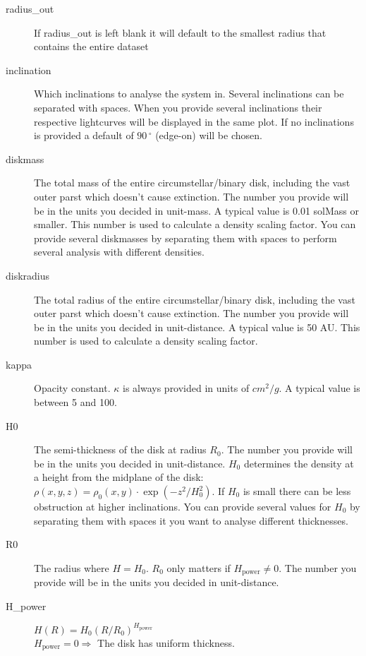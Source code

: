 \documentclass[a4paper, 12pt, english, titlepage]{article}
\newcommand{\degree}{\, ^\circ}    %
\begin{document}
\begin{description}
        \item[radius\_out]
            If radius\_out is left blank it will default to the smallest radius that contains the entire dataset
        \item[inclination]
            Which inclinations to analyse the system in. Several inclinations can be separated with spaces. When you provide several inclinations their respective lightcurves will be displayed in the same plot. If no inclinations is provided a default of $90\degree$ (edge-on) will be chosen.
        \item[diskmass]
            The total mass of the entire circumstellar/binary disk, including the vast outer parst which doesn't cause extinction. The number you provide will be in the units you decided in unit-mass. A typical value is 0.01 solMass or smaller. This number is used to calculate a density scaling factor. You can provide several diskmasses by separating them with spaces to perform several analysis with different densities.
        \item[diskradius]
            The total radius of the entire circumstellar/binary disk, including the vast outer parst which doesn't cause extinction. The number you provide will be in the units you decided in unit-distance. A typical value is 50 AU. This number is used to calculate a density scaling factor.
        \item[kappa]
            Opacity constant. $\kappa$ is always provided in units of $cm^2 / g$. A typical value is between 5 and 100.
        \item[H0]
            The semi-thickness of the disk at radius $R_0$. The number you provide will be in the units you decided in unit-distance. $H_0$ determines the density at a height from the midplane of the disk:
            $\rho(x, y, z) = \rho_0(x, y) \cdot \exp\left(- z^2 / H_0^2\right)$.
            If $H_0$ is small there can be less obstruction at higher inclinations.
            You can provide several values for $H_0$ by separating them with spaces it you want to analyse different thicknesses.
        \item[R0]
            The radius where $H = H_0$. $R_0$ only matters if $H_\textrm{power} \neq 0$. 
            The number you provide will be in the units you decided in unit-distance.
        \item[H\_power]
            $H(R) = H_0 (R/R_0)^{H_\textrm{power}}$ \\
            $H_\textrm{power} = 0 \Rightarrow$ The disk has uniform thickness. \\

\end{description}
\end{document}
